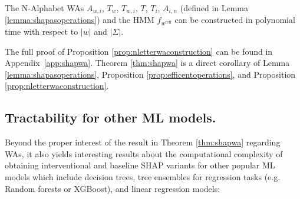 \begin{proposition} \label{prop:nletterwaconstruction}
   The N-Alphabet WAs $A_{w,i}$, $T_{w}$, $T_{w,i}$, $T$, $T_{i}$, $A_{i,n}$ (defined in Lemma \ref{lemma:shapasoperations}) and the HMM $f_{w^{\text{reff}}}$ can be constructed in polynomial time with respect to $|w|$ and $|\Sigma|$.
\end{proposition}

The full proof of Proposition \ref{prop:nletterwaconstruction} can be found in Appendix~\ref{app:shapwa}. Theorem \ref{thm:shapwa} is a direct corollary of Lemma \ref{lemma:shapasoperations}, Proposition \ref{prop:efficentoperations}, and Proposition \ref{prop:nletterwaconstruction}.


\subsection{Tractability for other ML models.} \label{subsec:tree2WA}

Beyond the proper interest of the result in Theorem \ref{thm:shapwa} regarding WAs, it also yields interesting results about the computational complexity of obtaining interventional and baseline SHAP variants for other popular ML models which include decision trees, tree ensembles for regression tasks (e.g. Random forests or XGBoost), and linear regression models:


